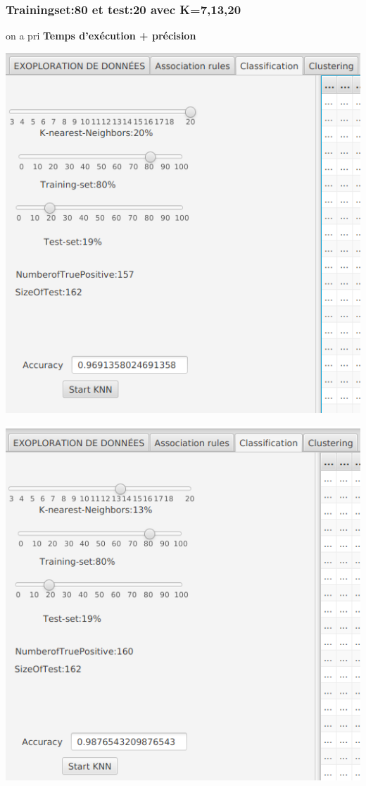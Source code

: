 \documentclass[12pt,a4paper,oneside]{book}
\begin{document}
	\subsubsection{Trainingset:80 et test:20 avec K=7,13,20}
	
	 on a pri
		\textbf{Temps d'exécution + précision}\\
		\begin{frame}{}
			\centering
			\begin{minipage}[b]{0.5\linewidth}
				\includegraphics[scale=0.5]{image/k=20unbalanced.png}
				\label{labelname}%
			\end{minipage}
			\hspace{0.25cm}
			\begin{minipage}[b]{0.5\linewidth}
				\includegraphics[scale=0.5]{image/k=13unbalanced.png}%

\end{minipage}
\end{frame}
\end{document}
